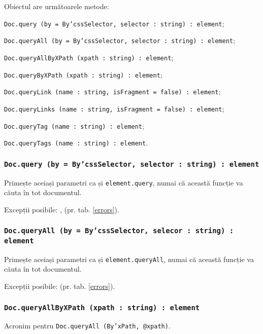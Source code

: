Obiectul \dom{} are următoarele metode:
\begin{icItems}
	\item \texttt{Doc.query (by = By'cssSelector, selector : string) : element};
	\item \texttt{Doc.queryAll (by = By'cssSelector, selector : string) : element};
	\item \texttt{Doc.queryAllByXPath (xpath : string) : element};
	\item \texttt{Doc.queryByXPath (xpath : string) : element};
	\item \texttt{Doc.queryLink (name : string, isFragment = false) : element};
	\item \texttt{Doc.queryLinks (name : string, isFragment = false) : element};
	\item \texttt{Doc.queryTag (name : string) : element};
	\item \texttt{Doc.queryTags (name : string) : element}.
\end{icItems}

\subsubsection{\texttt{Doc.query (by = By'cssSelector, selector : string) : element}}

Primește aceiași parametri ca și  \texttt{element.query}, numai că această funcție va căuta în tot documentul.

Excepții posibile: ,  (pr. tab. \ref{errors}).

\subsubsection{\texttt{Doc.queryAll (by = By'cssSelector, selecor : string) : element}}

Primește aceiași parametri ca și \texttt{element.queryAll}, numai că această funcție va căuta în tot documentul.

Excepții posibile:  (pr. tab. \ref{errors}).

\subsubsection{\texttt{Doc.queryAllByXPath (xpath : string) : element}}

Acronim pentru \texttt{Doc.queryAll (By'xPath, @xpath)}.

